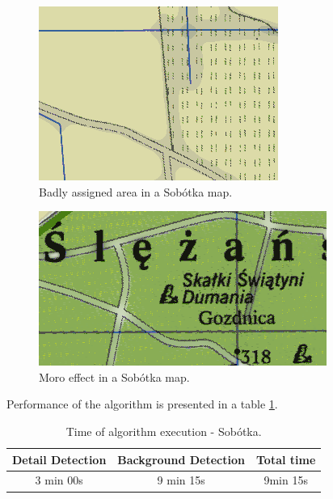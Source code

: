 \documentclass[a4paper,onecolumn,oneside,12pt]{memoir}
\begin{document}
\begin{figure}[!ht]
\begin{center}
\includegraphics[scale=1.0]{images/sobotkaBadColorAssignment.png}
\caption{Badly assigned area in a Sobótka map.}
\label{sobotkaBadColorAssignment}
\end{center}
\end{figure}

\begin{figure}[!ht]
\begin{center}
\includegraphics[scale=1.0]{images/sobotkaMoroEffect.png}
\caption{Moro effect in a Sobótka map.}
\label{sobotkaMoroEffect}
\end{center}
\end{figure}

Performance of the algorithm is presented in a table \ref{sobotkaPerformance}.

\begin{table}[!ht]
\begin{center}
\caption{Time of algorithm execution - Sobótka.}
\label{sobotkaPerformance}
\begin{tabular}{|c|c|c|}
  \hline
  Detail Detection & Background Detection & Total time \\
  \hline
  3 min 00s & 9 min 15s & 9min 15s \\
  \hline
\end{tabular}
\end{center}
\end{table}
\end{document}
